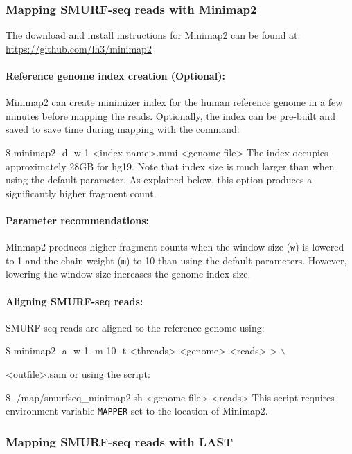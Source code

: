 \documentclass[11pt]{article}
\newenvironment{cmd}
{\list{}{
    \parsep=0em
    \itemindent=17pt
    \listparindent=50pt
    \leftmargin=0in
    \rightmargin=0in
  }\item[] \ttfamily \$}
{\endlist}
\begin{document}
\subsubsection{Mapping SMURF-seq reads with Minimap2}
\label{minimap}

The download and install instructions for Minimap2 can be found at:
\url{https://github.com/lh3/minimap2}

\paragraph{Reference genome index creation (Optional):}
Minimap2 can create minimizer index for the human reference genome in
a few minutes before mapping the reads. Optionally, the
index can be pre-built and saved to save time during mapping with
the command:
\begin{cmd}
  minimap2 -d -w 1 <index name>.mmi <genome file>
\end{cmd}
The index occupies approximately 28GB for hg19. Note that index size
is much larger than when using the default parameter. As explained below,
this option produces a significantly higher fragment count.

\paragraph{Parameter recommendations:}
Minmap2 produces higher fragment counts when the window size (\texttt{w})
is lowered to 1 and the chain weight (\texttt{m}) to 10 than using the
default parameters. However, lowering the window size increases the
genome index size.


\paragraph{Aligning SMURF-seq reads:}
SMURF-seq reads are aligned to the reference genome using:
\begin{cmd}
  minimap2 -a -w 1 -m 10 -t <threads> <genome> <reads> > $\backslash$
    \par <outfile>.sam
\end{cmd}
or using the script:
\begin{cmd}
  ./map/smurfseq\_minimap2.sh <genome file> <reads>
\end{cmd}
This script requires environment variable \texttt{MAPPER} set to the
location of Minimap2.

\subsubsection{Mapping SMURF-seq reads with LAST}
\label{last}
\end{document}
